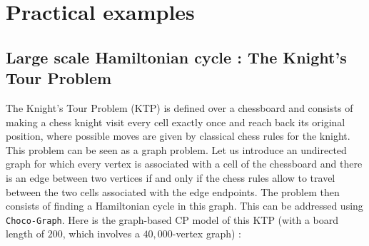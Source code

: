 \documentclass{article}
\begin{document}
\newpage{}
\section{Practical examples}

\subsection{Large scale Hamiltonian cycle : The Knight's Tour Problem}

The Knight's Tour Problem (KTP) is defined over a chessboard and consists of making a chess knight visit every cell exactly once and reach back its original position, where possible moves are given by classical chess rules for the knight. This problem can be seen as a graph problem. Let us introduce an undirected graph for which every vertex is associated with a cell of the chessboard and there is an edge between two vertices if and only if the chess rules allow to travel between the two cells associated with the edge endpoints. The problem then consists of finding a Hamiltonian cycle in this graph. This can be addressed using \texttt{Choco-Graph}. Here is the graph-based CP model of this KTP (with a board length of $200$, which involves a $40,000$-vertex graph) : 
\end{document}

